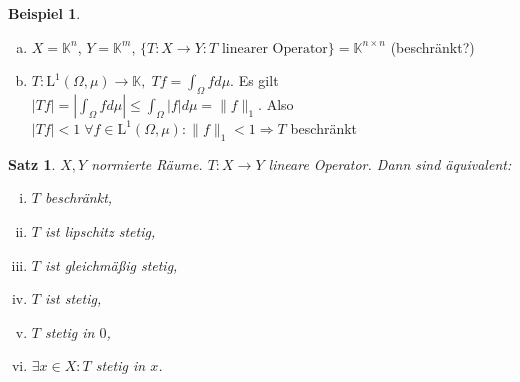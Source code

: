 \documentclass[ngerman]{report}
\theoremstyle{definition}%
\newtheorem{bsp}[section]{Beispiel}
\theoremstyle{myStyle}
\theoremstyle{plain}%
\newtheorem{thm}[subsection]{Satz}
\newcommand{\K}{\mathbb{K}}
\newcommand{\lL}[2][\Omega,\mu]{\text{L}^{#2}(#1)} %
\newcommand{\norm}[1]{\|#1\|}
\newcommand{\intl}[1]{\int_\Omega #1 d\mu} %
\newcommand{\df}{\Rightarrow} %
\begin{document}
	\begin{bsp}
		\begin{enumerate}[a)]
			\item $X = \K^n$, $Y = \K^m$, $\{T: X\to Y: T \text{ linearer Operator}\} = \K^{n \times n}$
			(beschränkt?)
			\item $T: \lL{1} \to \K, \; Tf = \intl{f}.$ 
				Es gilt $|Tf| = |\intl{f}| \leq \intl{|f|} = \norm{f}_1.$
				Also $|Tf| < 1 \; \forall f \in \lL{1}: \norm{f}_1 < 1 \df T$ beschränkt
		\end{enumerate}
	\end{bsp}

	\begin{thm}
		$X,Y$ normierte Räume. $T: X\to Y$ lineare Operator. Dann sind äquivalent:
			\begin{enumerate}[(i)]
				\item $T$ beschränkt,
				\item $T$ ist lipschitz stetig,
				\item $T$ ist gleichmäßig stetig,
				\item $T$ ist stetig,
				\item $T$ stetig in $0$,
				\item $\exists x \in X: T$ stetig in $x$.
			\end{enumerate}
	\end{thm}

\end{document}
